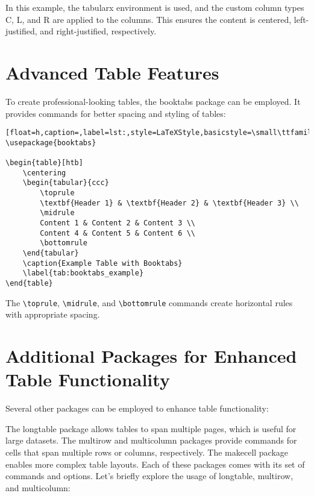 In this example, the tabularx environment is used, and the custom column types C, L, and R are applied to the columns. This ensures the content is centered, left-justified, and right-justified, respectively.

\section{Advanced Table Features}

To create professional-looking tables, the booktabs package can be employed. It provides commands for better spacing and styling of tables:

\begin{lstlisting}[float=h,caption=,label=lst:,style=LaTeXStyle,basicstyle=\small\ttfamily,]
\usepackage{booktabs}

\begin{table}[htb]
    \centering
    \begin{tabular}{ccc}
        \toprule
        \textbf{Header 1} & \textbf{Header 2} & \textbf{Header 3} \\
        \midrule
        Content 1 & Content 2 & Content 3 \\
        Content 4 & Content 5 & Content 6 \\
        \bottomrule
    \end{tabular}
    \caption{Example Table with Booktabs}
    \label{tab:booktabs_example}
\end{table}
\end{lstlisting}

The \lstinline|\toprule|, \lstinline|\midrule|, and \lstinline|\bottomrule| commands create horizontal rules with appropriate spacing.

\section{Additional Packages for Enhanced Table Functionality}

Several other packages can be employed to enhance table functionality:

The longtable package allows tables to span multiple pages, which is useful for large datasets.
The multirow and multicolumn packages provide commands for cells that span multiple rows or columns, respectively.
The makecell package enables more complex table layouts.
Each of these packages comes with its set of commands and options. Let's briefly explore the usage of longtable, multirow, and multicolumn:

